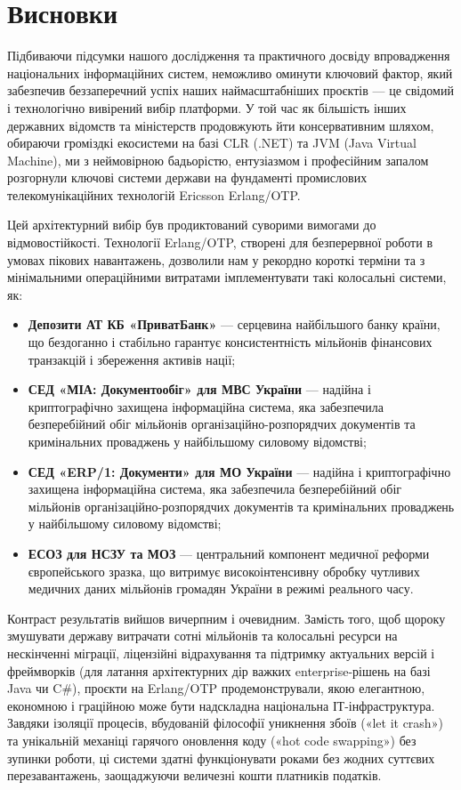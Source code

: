 \chapter{Висновки}

Підбиваючи підсумки нашого дослідження та практичного досвіду впровадження національних інформаційних систем, неможливо оминути ключовий фактор, який забезпечив беззаперечний успіх наших наймасштабніших проєктів — це свідомий і технологічно вивірений вибір платформи. У той час як більшість інших державних відомств та міністерств продовжують йти консервативним шляхом, обираючи громіздкі екосистеми на базі CLR (.NET) та JVM (Java Virtual Machine), ми з неймовірною бадьорістю, ентузіазмом і професійним запалом розгорнули ключові системи держави на фундаменті промислових телекомунікаційних технологій Ericsson Erlang/OTP.

Цей архітектурний вибір був продиктований суворими вимогами до відмовостійкості. Технології Erlang/OTP, створені для безперервної роботи в умовах пікових навантажень, дозволили нам у рекордно короткі терміни та з мінімальними операційними витратами імплементувати такі колосальні системи, як:
\begin{itemize}
    \item \textbf{Депозити АТ КБ «ПриватБанк»} — серцевина найбільшого банку країни, що бездоганно і стабільно гарантує консистентність мільйонів фінансових транзакцій і збереження активів нації;
    \item \textbf{СЕД «МІА: Документообіг» для МВС України} — надійна і криптографічно захищена інформаційна система, яка забезпечила безперебійний обіг мільйонів організаційно-розпорядчих документів та кримінальних проваджень у найбільшому силовому відомстві;
    \item \textbf{СЕД «ERP/1: Документи» для МО України} — надійна і криптографічно захищена інформаційна система, яка забезпечила безперебійний обіг мільйонів організаційно-розпорядчих документів та кримінальних проваджень у найбільшому силовому відомстві;
    \item \textbf{ЕСОЗ для НСЗУ та МОЗ} — центральний компонент медичної реформи європейського зразка, що витримує високоінтенсивну обробку чутливих медичних даних мільйонів громадян України в режимі реального часу.
\end{itemize}

Контраст результатів вийшов вичерпним і очевидним. Замість того, щоб щороку змушувати державу витрачати сотні мільйонів та колосальні ресурси на нескінченні міграції, ліцензійні відрахування та підтримку актуальних версій і фреймворків (для латання архітектурних дір важких enterprise-рішень на базі Java чи C\#), проєкти на Erlang/OTP продемонстрували, якою елегантною, економною і граційною може бути надскладна національна ІТ-інфраструктура. Завдяки ізоляції процесів, вбудованій філософії уникнення збоїв («let it crash») та унікальній механіці гарячого оновлення коду («hot code swapping») без зупинки роботи, ці системи здатні функціонувати роками без жодних суттєвих перезавантажень, заощаджуючи величезні кошти платників податків.

